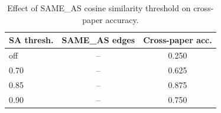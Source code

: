 \begin{table}[t]
\centering
\caption{Effect of SAME\_AS cosine similarity threshold on cross-paper accuracy.}
\label{tab:sameas}
\begin{tabular}{lcc}
\toprule
SA thresh. & SAME\_AS edges & Cross-paper acc. \\
\midrule
off & -- & 0.250 \\
0.70 & -- & 0.625 \\
0.85 & -- & 0.875 \\
0.90 & -- & 0.750 \\
\bottomrule
\end{tabular}
\end{table}
